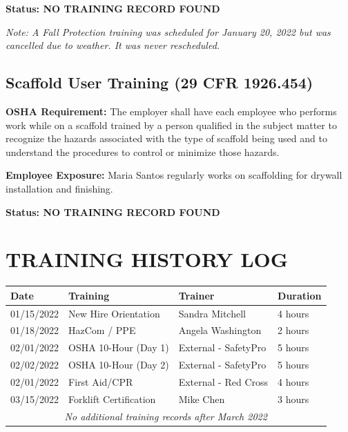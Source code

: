\documentclass[11pt]{article}
\begin{document}
\textbf{\color{warningred} Status: NO TRAINING RECORD FOUND}

\textit{Note: A Fall Protection training was scheduled for January 20, 2022 but was cancelled due to weather. It was never rescheduled.}

\subsection*{Scaffold User Training (29 CFR 1926.454)}

\textbf{OSHA Requirement:} The employer shall have each employee who performs work while on a scaffold trained by a person qualified in the subject matter to recognize the hazards associated with the type of scaffold being used and to understand the procedures to control or minimize those hazards.

\textbf{Employee Exposure:} Maria Santos regularly works on scaffolding for drywall installation and finishing.

\textbf{\color{warningred} Status: NO TRAINING RECORD FOUND}

\vspace{2em}

\section*{TRAINING HISTORY LOG}

\begin{tabular}{@{}p{2.5cm}p{5cm}p{3cm}p{3cm}@{}}
\toprule
\textbf{Date} & \textbf{Training} & \textbf{Trainer} & \textbf{Duration} \\
\midrule
01/15/2022 & New Hire Orientation & Sandra Mitchell & 4 hours \\
01/18/2022 & HazCom / PPE & Angela Washington & 2 hours \\
02/01/2022 & OSHA 10-Hour (Day 1) & External - SafetyPro & 5 hours \\
02/02/2022 & OSHA 10-Hour (Day 2) & External - SafetyPro & 5 hours \\
02/01/2022 & First Aid/CPR & External - Red Cross & 4 hours \\
03/15/2022 & Forklift Certification & Mike Chen & 3 hours \\
\midrule
\multicolumn{4}{c}{\textit{No additional training records after March 2022}} \\
\bottomrule
\end{tabular}

\vspace{2em}
\end{document}
